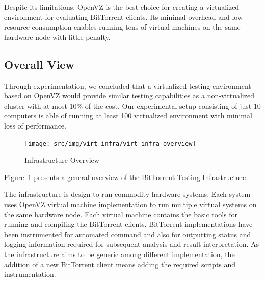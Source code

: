 Despite its limitations, OpenVZ is the best choice for creating a virtualized
environment for evaluating BitTorrent clients. Its minimal overhead and
low-resource consumption enables running tens of virtual machines on the same
hardware node with little penalty.

\subsection{Overall View}
\label{sec:virt-overall}



Through experimentation, we concluded that a virtualized testing environment
based on OpenVZ would provide similar testing capabilities as a
non-virtualized cluster with at most 10\% of the cost. Our  experimental setup
consisting of just 10 computers is able of running at least 100 virtualized
environment with minimal loss of performance.

\begin{figure}
  \begin{center}
    \texttt{[image: src/img/virt-infra/virt-infra-overview]}
  \end{center}
  \caption{Infrastructure Overview}
  \label{fig:virt-infra:infrastructure-overview}
\end{figure}

Figure~\ref{fig:virt-infra:infrastructure-overview} presents a general
overview of the BitTorrent Testing Infrastructure.

The infrastructure is design to run commodity hardware systems. Each system
uses OpenVZ virtual machine implementation to run multiple virtual systems on
the same hardware node.  Each virtual machine contains the basic tools for
running and compiling the BitTorrent clients. BitTorrent implementations have
been instrumented for automated command and also for outputting status and
logging information required for subsequent analysis and result
interpretation. As the infrastructure aims to be generic among different
implementation, the addition of a new BitTorrent client means adding the
required scripts and instrumentation.

